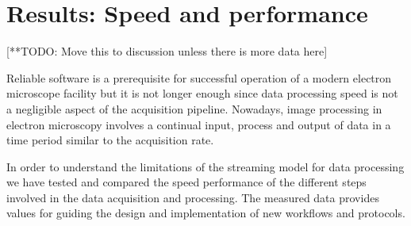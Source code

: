 \section{Results: Speed and performance}

[**TODO: Move this to discussion unless there is more  data here]

Reliable software is a prerequisite for successful operation of a modern electron microscope facility but it is not longer enough since data processing speed is not a negligible aspect of the acquisition pipeline. Nowadays, image processing  in electron microscopy involves a continual input, process and output of data in a time period similar to the acquisition rate.

In order to understand the limitations of the streaming model for data processing we have tested and compared the speed performance of the different steps involved in the data acquisition and processing. The measured data provides values for guiding the design and implementation of new workflows and protocols.

